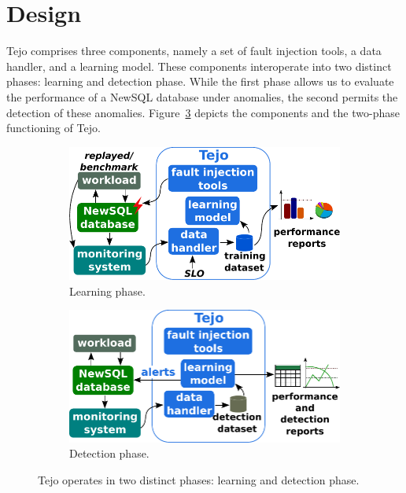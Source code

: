\section{Design}
\label{sec:design}

Tejo comprises three components, namely a set of fault injection tools, a data handler, and a learning model. These components interoperate into two distinct phases: learning and detection phase. While the first phase allows us to evaluate the performance of a NewSQL database under anomalies, the second permits the detection of these anomalies. Figure~\ref{fig:tejo_overview} depicts the components and the two-phase functioning of Tejo.


\begin{figure}
        \centering
        \begin{subfigure}[b]{0.48\textwidth}
               \includegraphics[width=1\textwidth]{inputs/img/tejo_overview_learning_newsql}
                \caption{Learning phase.}
                \label{fig:tejo_overview_learning}
        \end{subfigure}
        \begin{subfigure}[b]{0.48\textwidth}
                  \includegraphics[width=1\textwidth]{inputs/img/tejo_overview_detection_newsql}
                \caption{Detection phase.}
                \label{fig:tejo_overview_detecting}
        \end{subfigure}
        \caption{Tejo operates in two distinct phases: learning and detection phase.}\label{fig:tejo_overview}
\end{figure}

